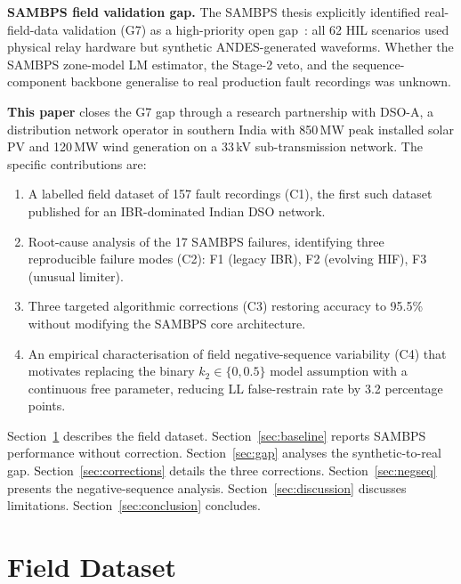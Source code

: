 \documentclass[journal]{IEEEtran}
\newcommand{\ktwo}{k_2}
\begin{document}
\textbf{SAMBPS field validation gap.}
The SAMBPS thesis explicitly identified real-field-data validation (G7)
as a high-priority open gap~\cite{SAMBP_TR65}: all 62 HIL scenarios used
physical relay hardware but synthetic ANDES-generated waveforms.
Whether the SAMBPS zone-model LM estimator, the Stage-2 veto, and the
sequence-component backbone generalise to real production fault recordings
was unknown.

\textbf{This paper} closes the G7 gap through a research partnership
with DSO-A, a distribution network operator in southern India with
850\,MW peak installed solar PV and 120\,MW wind generation on a 33\,kV
sub-transmission network.  The specific contributions are:
\begin{enumerate}[(C1)]
  \item A labelled field dataset of 157 fault recordings (C1), the first
        such dataset published for an IBR-dominated Indian DSO network.
  \item Root-cause analysis of the 17 SAMBPS failures, identifying three
        reproducible failure modes (C2): F1 (legacy IBR), F2 (evolving HIF),
        F3 (unusual limiter).
  \item Three targeted algorithmic corrections (C3) restoring accuracy to
        95.5\% without modifying the SAMBPS core architecture.
  \item An empirical characterisation of field negative-sequence variability
        (C4) that motivates replacing the binary $\ktwo \in \{0, 0.5\}$
        model assumption with a continuous free parameter, reducing
        LL false-restrain rate by 3.2 percentage points.
\end{enumerate}

Section~\ref{sec:dataset} describes the field dataset.
Section~\ref{sec:baseline} reports SAMBPS performance without correction.
Section~\ref{sec:gap} analyses the synthetic-to-real gap.
Section~\ref{sec:corrections} details the three corrections.
Section~\ref{sec:negseq} presents the negative-sequence analysis.
Section~\ref{sec:discussion} discusses limitations.
Section~\ref{sec:conclusion} concludes.

\section{Field Dataset}
\label{sec:dataset}
\end{document}

